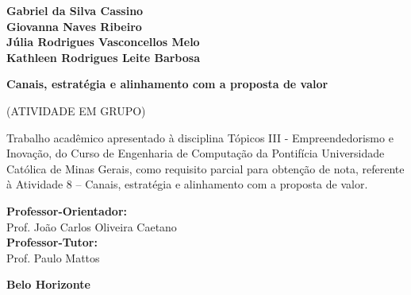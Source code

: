 \begin{titlepage}
    \begin{center}
        
        {\large \textbf{Gabriel da Silva Cassino}} \\
 
        {\large \textbf{Giovanna Naves Ribeiro}} \\
        {\large \textbf{Júlia Rodrigues Vasconcellos Melo}} \\
        {\large \textbf{Kathleen Rodrigues Leite Barbosa}}
        
        \vspace*{10cm}
        
        {\Large \textbf{Canais, estratégia e alinhamento com a proposta de valor}}
        
        \vspace{0.25cm}
        {\Large (ATIVIDADE EM GRUPO)}
        
        \vfill
        
    \end{center}
    
    \begin{flushright}
        \begin{minipage}{8cm}
            \begin{singlespace}
                {\small
                    Trabalho acadêmico apresentado à disciplina
                    Tópicos III - Empreendedorismo e Inovação,
                    do Curso de Engenharia de Computação da
                    Pontifícia Universidade Católica de Minas
                    Gerais, como requisito parcial para obtenção
                    de nota, referente à Atividade 8 -- Canais, estratégia e alinhamento com a proposta de valor.
                }
                
                \vspace{0.5cm}
                {\small
                \textbf{Professor-Orientador:} \\Prof. João Carlos Oliveira Caetano \\
                \textbf{Professor-Tutor:} \\Prof. Paulo Mattos
                }
            \end{singlespace}
        \end{minipage}
    \end{flushright}
    
    \vspace*{3cm}
    
    \begin{center}
        {\large \textbf{Belo Horizonte}} \\
        {\large \textbf{\the\year}}
    \end{center}

\end{titlepage}

\tableofcontents
\newpage